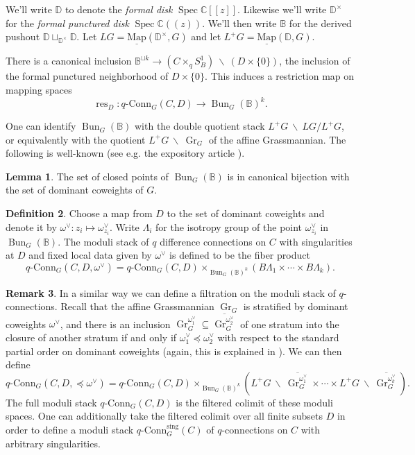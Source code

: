 \documentclass[11pt, oneside, reqno]{amsart}
\theoremstyle{definition} \newtheorem{definition}{Definition}[section]
\newtheorem{lemma}[definition]{Lemma}
\theoremstyle{definition} \newtheorem{remark}[definition]{Remark}
\theoremstyle{definition} \newtheorem{remarks}[definition]{Remarks}
\theoremstyle{definition} \newtheorem{question}[definition]{Question}
\theoremstyle{definition} \newtheorem*{note}{Note}
\theoremstyle{definition} \newtheorem{example}[definition]{Example}
\theoremstyle{definition} \newtheorem{examples}[definition]{Examples}
\newcommand{\bb}[1]{\mathbb{#1}}
\newcommand{\mr}[1]{\mathrm{#1}}
\newcommand{\bs}{\ \backslash \ }
\newcommand{\ul}[1]{\underline{#1}}
\newcommand{\ol}[1]{\overline{#1}}
\newcommand{\CC}{\mathbb{C}}
\newcommand{\sub}{\subseteq}
\DeclareMathOperator{\bun}{Bun}
\DeclareMathOperator{\Gr}{Gr}
\DeclareMathOperator{\spec}{Spec}
\DeclareMathOperator{\res}{res}
\newcommand{\map}{\ul{\mr{Map}}}
\newcommand{\qconn}{q\text{-Conn}}
\begin{document}
We'll write $\bb D$ to denote the \emph{formal disk} $\spec \CC[[z]]$.  Likewise we'll write $\bb D^\times$ for the \emph{formal punctured disk} $\spec \CC(\!(z)\!)$.  We'll then write $\bb B$ for the derived pushout $\bb D \sqcup_{\bb D^\times} \bb D$.  Let $LG = \map(\bb D^\times, G)$ and let $L^+G = \map(\bb D, G)$.

There is a canonical inclusion $\bb B^{\sqcup k} \to (C \times_q S^1_B) \!\!\bs\!\! (D \times \{0\})$, the inclusion of the formal punctured neighborhood of $D \times \{0\}$.  This induces a restriction map on mapping spaces
\[\res_D \colon \qconn_G(C, D) \to \bun_G(\bb B)^k.\]

One can identify $\bun_G(\bb B)$ with the double quotient stack $L^+G \!\bs\! LG / L^+G$, or equivalently with the quotient $L^+G \!\bs\! \Gr_G$ of the affine Grassmannian.  The following is well-known (see e.g. the expository article \cite{Zhu}).

\begin{lemma}
The set of closed points of $\bun_G(\bb B)$ is in canonical bijection with the set of dominant coweights of $G$.
\end{lemma}

\begin{definition}
Choose a map from $D$ to the set of dominant coweights and denote it by $\omega^\vee \colon z_i \mapsto \omega^\vee_{z_i}$.  Write $\Lambda_i$ for the isotropy group of the point $\omega^\vee_{z_i}$ in $\bun_G(\bb B)$. The moduli stack of $q$ difference connections on $C$ with singularities at $D$ and fixed local data given by $\omega^\vee$ is defined to be the fiber product
\[\qconn_G(C,D, \omega^\vee) = \qconn_G(C,D) \times_{\bun_G(\bb B)^k} (B\Lambda_1 \times \cdots \times B\Lambda_k).\]
\end{definition}

\begin{remark}\label{ind_structure_remark}
  In a similar way we can define a filtration on the moduli stack of
  $q$-connections.  Recall that the affine Grassmannian $\Gr_G$ is
  stratified by dominant coweights $\omega^\vee$, and there is an
  inclusion $\Gr_G^{\omega^\vee_1}\sub \ol{\Gr_G^{\omega^\vee_2}}$ of
  one stratum into the closure of another stratum if and only if
  $\omega^\vee_1 \preceq \omega^\vee_2$ with respect to the standard
  partial order on dominant coweights (again, this is explained in \cite{Zhu}).  We can then define
\[\qconn_G(C,D, \preceq \omega^\vee) = \qconn_G(C,D) \times_{\bun_G(\bb B)^k} \left(L^+G \!\!\bs\!\! \ol{\Gr_G^{\omega^\vee_1}} \times \cdots \times L^+G \!\!\bs\!\! \ol{\Gr_G^{\omega^\vee_k}}\right).\]
The full moduli stack $\qconn_G(C,D)$ is the filtered colimit of these moduli spaces.  One can additionally take the filtered colimit over all finite subsets $D$ in order to define a moduli stack $\qconn^\mr{sing}_G(C)$ of $q$-connections on $C$ with arbitrary singularities.
\end{remark}
\end{document}
